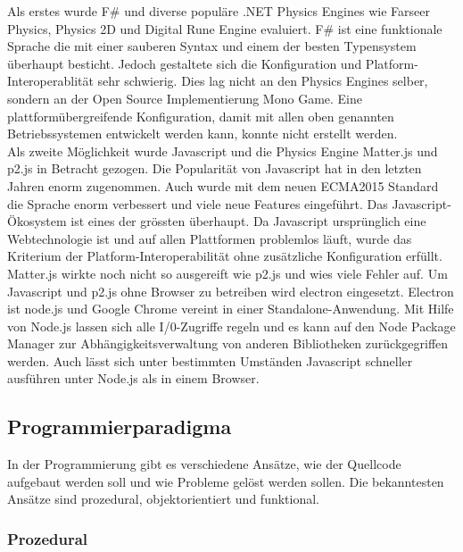     Als erstes wurde F\# und diverse populäre .NET Physics Engines wie Farseer Physics,
    Physics 2D und Digital Rune Engine evaluiert.
    F\# ist eine funktionale Sprache die mit einer sauberen Syntax und einem der besten Typensystem überhaupt besticht.
    Jedoch gestaltete sich die Konfiguration und Platform-Interoperablität sehr schwierig.
    Dies lag nicht an den Physics Engines selber, sondern an der Open Source Implementierung Mono Game.
    Eine plattformübergreifende Konfiguration,
    damit mit allen oben genannten Betriebssystemen entwickelt werden kann,
    konnte nicht erstellt werden.
    \\
    Als zweite Möglichkeit wurde Javascript und die Physics Engine Matter.js und p2.js in Betracht gezogen.
    Die Popularität von Javascript hat in den letzten Jahren enorm zugenommen.
    Auch wurde mit dem neuen ECMA2015 Standard die Sprache enorm verbessert und viele neue Features eingeführt.
    Das Javascript-Ökosystem ist eines der grössten überhaupt.
    Da Javascript ursprünglich eine Webtechnologie ist und auf allen Plattformen problemlos läuft,
    wurde das Kriterium der Platform-Interoperabilität ohne zusätzliche Konfiguration erfüllt.
    Matter.js wirkte noch nicht so ausgereift wie p2.js und wies viele Fehler auf.
    Um Javascript und p2.js ohne Browser zu betreiben wird electron eingesetzt.
    Electron ist node.js und Google Chrome vereint in einer Standalone-Anwendung.
    Mit Hilfe von Node.js lassen sich alle I/0-Zugriffe regeln und es kann auf den
    Node Package Manager zur Abhängigkeitsverwaltung von anderen Bibliotheken zurückgegriffen werden.
    Auch lässt sich unter bestimmten Umständen Javascript schneller ausführen unter Node.js als in einem Browser.

    \subsection{Programmierparadigma\label{sub:TechnologyParadigma}}

      In der Programmierung gibt es verschiedene Ansätze,
      wie der Quellcode aufgebaut werden soll und wie Probleme gelöst werden sollen.
      Die bekanntesten Ansätze sind prozedural, objektorientiert und funktional.

      \subsubsection{Prozedural\label{subsub:TechnologyParadigmaProzedural}}

